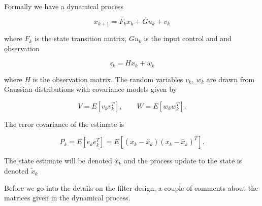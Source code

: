 Formally we have a dynamical process

\[x_{k+1} = F_k x_k + Gu_k + v_k\]

where \(F_k\) is the state transition matrix, \(Gu_k\) is the input
control and and observation

\[z_k = Hx_k + w_k\]

where \(H\) is the observation matrix. The random variables \(v_k\),
\(w_k\) are drawn from Gaussian distributions with covariance models
given by

\[V = E[v_kv_k^T], \quad\quad W = E[w_kw_k^T].\]

The error covariance of the estimate is

\[P_k = E[e_ke_k^T] = E[(x_k - \hat{x}_k)(x_k - \hat{x}_k)^T] .\]

The state estimate will be denoted \(\hat{x}_k\) and the process update
to the state is denoted \(\tilde{x}_k\)

Before we go into the details on the filter design, a couple of comments
about the matrices given in the dynamical process.


